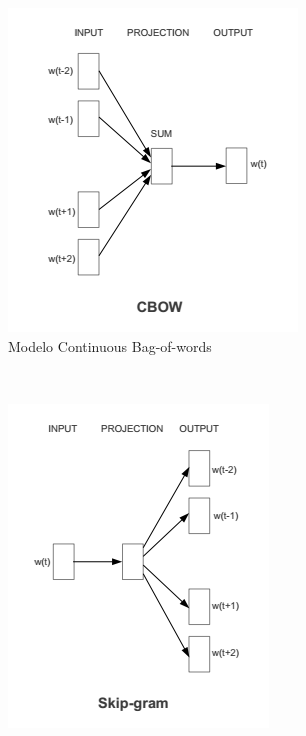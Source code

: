 \begin{figure}[h]
  \centering

  \begin{subfigure}[b]{0.45\textwidth}
    \includegraphics[width=\textwidth]{images/fig-2-cbow}
    \caption{Modelo Continuous Bag-of-words}
    \label{fig:cbow}
  \end{subfigure}
  ~
  \begin{subfigure}[b]{0.45\textwidth}
    \includegraphics[width=\textwidth]{images/fig-2-sg}

\end{subfigure}
\end{figure}
